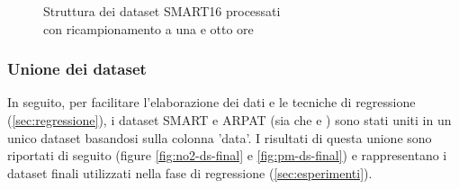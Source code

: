 \begin{figure}[H]%
    \centering
    \captionsetup{justification=centering}
    \caption{Struttura dei dataset SMART16 processati\\con ricampionamento a una e otto ore}%
    \label{fig:arpat-pm}%
\end{figure}

\subsubsection{Unione dei dataset}
In seguito, per facilitare l'elaborazione dei dati e le tecniche di regressione (\ref{sec:regressione}), i dataset SMART e ARPAT (sia  che  e ) sono stati uniti in un unico dataset basandosi sulla colonna 'data'.
I risultati di questa unione sono riportati di seguito (figure \ref{fig:no2-ds-final} e \ref{fig:pm-ds-final}) e rappresentano i dataset finali utilizzati nella fase di regressione (\ref{sec:esperimenti}).

